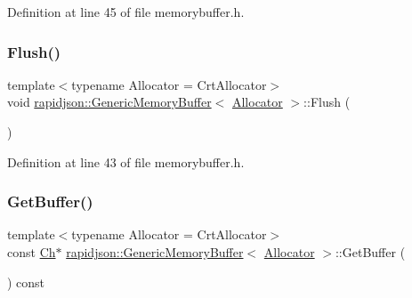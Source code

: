 Definition at line 45 of file memorybuffer.\+h.


\begin{DoxyCode}{0}

\end{DoxyCode}
\mbox{\label{structrapidjson_1_1_generic_memory_buffer_a66a3e80663d94506cab0117777486a06}} 
\subsubsection{\texorpdfstring{Flush()}{Flush()}}
{\footnotesize\ttfamily template$<$typename Allocator  = Crt\+Allocator$>$ \\
void \mbox{\hyperlink{structrapidjson_1_1_generic_memory_buffer}{rapidjson\+::\+Generic\+Memory\+Buffer}}$<$ \mbox{\hyperlink{classrapidjson_1_1_allocator}{Allocator}} $>$\+::Flush (\begin{DoxyParamCaption}{ }\end{DoxyParamCaption})}



Definition at line 43 of file memorybuffer.\+h.


\begin{DoxyCode}{0}

\end{DoxyCode}
\mbox{\label{structrapidjson_1_1_generic_memory_buffer_a2c05ddb3b37a57fc941d7b377e95b67a}} 
\subsubsection{\texorpdfstring{GetBuffer()}{GetBuffer()}}
{\footnotesize\ttfamily template$<$typename Allocator  = Crt\+Allocator$>$ \\
const \mbox{\hyperlink{structrapidjson_1_1_generic_memory_buffer_a7c2ccd0d38df6d3cb3abd5aed9e100f8}{Ch}}$\ast$ \mbox{\hyperlink{structrapidjson_1_1_generic_memory_buffer}{rapidjson\+::\+Generic\+Memory\+Buffer}}$<$ \mbox{\hyperlink{classrapidjson_1_1_allocator}{Allocator}} $>$\+::Get\+Buffer (\begin{DoxyParamCaption}{ }\end{DoxyParamCaption}) const}




